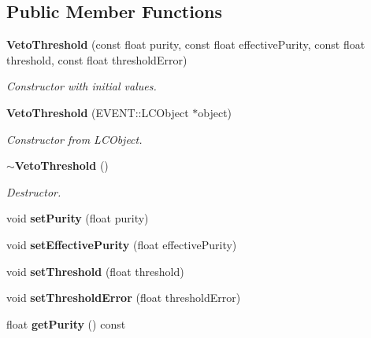 \subsection*{Public Member Functions}
\begin{DoxyCompactItemize}
\item 
{\bf Veto\-Threshold} (const float purity, const float effective\-Purity, const float threshold, const float threshold\-Error)\label{classCALICE_1_1VetoThreshold_a226f6dbb174911449b725d22212ec27f}

\begin{DoxyCompactList}\small\item\em Constructor with initial values. \end{DoxyCompactList}\item 
{\bf Veto\-Threshold} (E\-V\-E\-N\-T\-::\-L\-C\-Object $\ast$object)\label{classCALICE_1_1VetoThreshold_a4431022bd02ec81814b58a483aac7027}

\begin{DoxyCompactList}\small\item\em Constructor from L\-C\-Object. \end{DoxyCompactList}\item 
{\bf $\sim$\-Veto\-Threshold} ()\label{classCALICE_1_1VetoThreshold_a9f9b18a6fa485c21230ac896344f048d}

\begin{DoxyCompactList}\small\item\em Destructor. \end{DoxyCompactList}\item 
void {\bfseries set\-Purity} (float purity)\label{classCALICE_1_1VetoThreshold_ac5e33b1fc8d827493b95814ee3ec761a}

\item 
void {\bfseries set\-Effective\-Purity} (float effective\-Purity)\label{classCALICE_1_1VetoThreshold_af0b58c4922e7c8b20a077bc0c814492a}

\item 
void {\bfseries set\-Threshold} (float threshold)\label{classCALICE_1_1VetoThreshold_a09678e0ab3ff1350865f63a337092600}

\item 
void {\bfseries set\-Threshold\-Error} (float threshold\-Error)\label{classCALICE_1_1VetoThreshold_ae3fca9234b325c9f4a981402c4e3b07a}

\item 
float {\bf get\-Purity} () const \label{classCALICE_1_1VetoThreshold_a53c8bbcfa151ff8466aae71800437ee6}


\end{DoxyCompactItemize}
